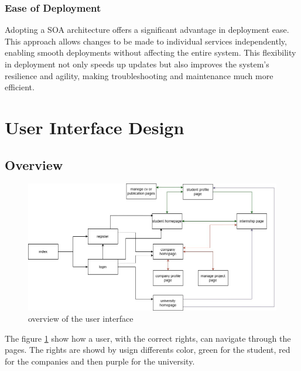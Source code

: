 \documentclass{article}
\begin{document}
\subsubsection{Ease of Deployment}
Adopting a SOA architecture offers a significant advantage in deployment ease. This approach allows changes to be made to individual services independently, enabling smooth deployments without affecting the entire system. This flexibility in deployment not only speeds up updates but also improves the system's resilience and agility, making troubleshooting and maintenance much more efficient.

\section{User Interface Design} 
\subsection{Overview}
\begin{figure}[H]
    \centering
    \includegraphics[width=1\linewidth]{interface/overviewInterface.jpg}
    \caption{overview of the user interface}
     \label{fig:overviewInterface}
\end{figure}
The figure \ref{fig:overviewInterface} show how a user, with the correct rights, can navigate through the pages. The rights are showd by usign differents color, green for the student, red for the companies and then purple for the university.
\end{document}
